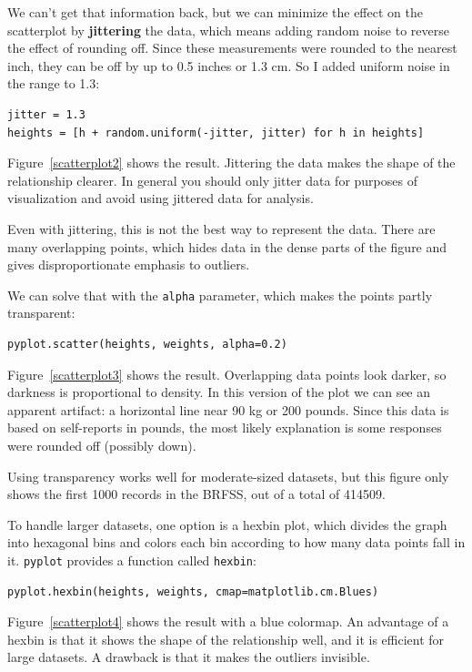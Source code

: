 \documentclass[12pt]{book}
\begin{document}
We can't get that information back, but we can minimize the effect on
the scatterplot by {\bf jittering} the data, which means adding random
noise to reverse the effect of rounding off.  Since these measurements
were rounded to the nearest inch, they can be off by up to 0.5 inches or
1.3 cm.  So I added uniform noise in the range  to 1.3:
%
\begin{verbatim}
jitter = 1.3
heights = [h + random.uniform(-jitter, jitter) for h in heights]
\end{verbatim}

Figure~\ref{scatterplot2} shows the result.  Jittering the data makes
the shape of the relationship clearer.  In general you should only jitter
data for purposes of visualization and avoid using jittered data
for analysis.

Even with jittering, this is not the best way to represent the data.
There are many overlapping points, which hides data
in the dense parts of the figure and gives disproportionate emphasis
to outliers.

We can solve that with the {\tt alpha} parameter, which makes
the points partly transparent:
%
\begin{verbatim}
pyplot.scatter(heights, weights, alpha=0.2)
\end{verbatim}
%
Figure~\ref{scatterplot3} shows the result.  Overlapping data
points look darker, so darkness is proportional to density.  In this
version of the plot we can see an apparent artifact: a horizontal line
near 90 kg or 200 pounds.  Since this data is based on self-reports in
pounds, the most likely explanation is some responses were rounded off
(possibly down).

Using transparency works well for moderate-sized datasets, but this
figure only shows the first 1000 records in the BRFSS, out of a total
of 414509.

To handle larger datasets, one option is a hexbin plot, which divides
the graph into hexagonal bins and colors each bin according to how many
data points fall in it.  {\tt pyplot} provides a function called 
{\tt hexbin}:
%
\begin{verbatim}
pyplot.hexbin(heights, weights, cmap=matplotlib.cm.Blues)
\end{verbatim}
%
Figure~\ref{scatterplot4} shows the result with a blue colormap.
An advantage of a hexbin is that it shows the shape of the relationship
well, and it is efficient for large datasets.  A drawback is that
it makes the outliers invisible.
\end{document}
